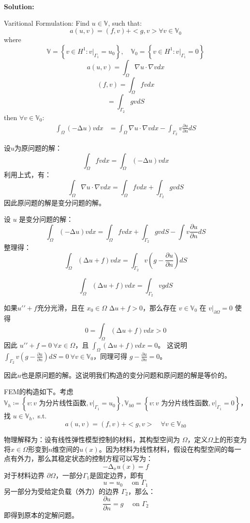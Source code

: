 \documentclass[UTF8]{ctexart}
\begin{document}
\textbf{Solution: }

Varitional Formulation: Find \(u \in {\mathbb{V}}\), such that:
\[a(u,v) = (f,v) + < g,v > \forall v \in {\mathbb{V}}_{0}\] where
\[{\mathbb{V}} = \left\{ v \in H^{1}:v|_{\Gamma_{1}} = u_{0} \right\},\quad{\mathbb{V}}_{0} = \left\{ v \in H^{1}:v|_{\Gamma_{1}} = 0 \right\}\]
\[a(u,v) = \int_{\Omega}\nabla u \cdot \nabla vdx\]
\[(f,v) = \int_{\Omega}fvdx\] \[< g,v > = \int_{\Gamma_{2}}gvdS\] then
\(\forall v \in {\mathbb{V}}_{0}\): \[\begin{aligned}
\int_{\Omega}( - \mathrm{\Delta}u)vdx & = \int_{\Omega}\nabla u \cdot \nabla vdx - \int_{\Gamma_{2}}v\frac{\partial u}{\partial n}dS
\end{aligned}\]

设\(u\)为原问题的解：
\[\int_{\Omega}fvdx = \int_{\Omega}( - \mathrm{\Delta}u)vdx\]
利用上式，有：
\[\int_{\Omega}\nabla u \cdot \nabla vdx = \int_{\Omega}fvdx + \int_{\Gamma_{2}}gvdS\]
因此原问题的解是变分问题的解。

设 \(u\) 是变分问题的解：
\[\int_{\Omega}( - \mathrm{\Delta}u)vdx = \int_{\Omega}fvdx + \int_{\Gamma_{2}}gvdS - \int v\frac{\partial u}{\partial n}dS\]
整理得：
\[\int_{\Omega}(\mathrm{\Delta}u + f)vdx = \int_{\Gamma_{2}}v\left( g - \frac{\partial u}{\partial n} \right)dS\]

\[\int_{\Omega}(\mathrm{\Delta}u + f)vdx = \int_{\Gamma_{2}}vgdS\]

如果\(u\prime\prime + f\)充分光滑，且在 \(x_{0} \in \Omega\)
\(\mathrm{\Delta}u + f > 0\)，那么存在 \(v \in {\mathbb{V}}_{0}\) 在
\(v|_{\partial\Omega} = 0\) 使得
\[0 = \int_{\Omega}(\mathrm{\Delta}u + f)vdx > 0\] 因此
\(u\prime\prime + f = 0\ \forall x \in \Omega\)，且
\(\int_{\Omega}(\mathrm{\Delta}u + f)vdx = 0\)。 这说明
\(\int_{\Gamma_{2}}v\left( g - \frac{\partial u}{\partial n} \right)dS = 0\ \forall v \in {\mathbb{V}}_{0}\)，同理可得
\(g - \frac{\partial u}{\partial n} = 0\)。

因此\(u\)也是原问题的解。这说明我们构造的变分问题和原问题的解是等价的。

FEM的构造如下。考虑
\({\mathbb{V}}_{h} ≔ \left\{ v:v\text{ 为分片线性函数},v|_{\Gamma_{1}} = u_{0} \right\},{\mathbb{V}}_{h0} = \left\{ v:v\text{ 为分片线性函数},v|_{\Gamma_{1}} = 0 \right\}\)，找
\(u \in {\mathbb{V}}_{h},\) s.t.
\[a(u,v) = (f,v) + < g,v > \quad\forall v \in {\mathbb{V}}_{h0}\]

物理解释为：设有线性弹性模型控制的材料，其构型空间为
\(\Omega\)，定义\(\Omega\)上的形变为将\(x \in \Omega\)形变到\(n\)维空间的\(u(x)\)。因为材料为线性材料，假设在构型空间的每一点有外力，那么其稳定状态的控制方程可以写为：
\[- \mathrm{\Delta}_{x}u(x) = f\] 对于材料边界
\(\partial\Omega\)，一部分\(\Gamma_{1}\)是固定边界，即有
\[u = u_{0}\quad\text{ on }\Gamma_{1}\]
另一部分为受给定负载（外力）的边界 \(\Gamma_{2}\)，那么：
\[\frac{\partial u}{\partial n} = g\quad\text{ on }\Gamma_{2}\]
即得到原本的定解问题。
\end{document}

